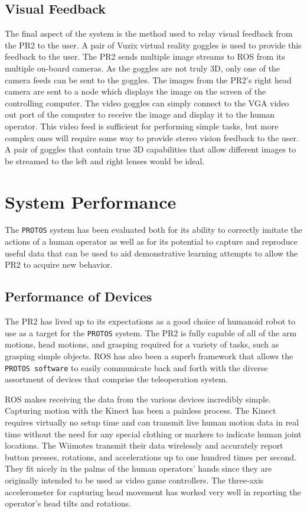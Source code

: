 \documentclass{sig-alternate}
\begin{document}
\subsection{Visual Feedback}
\indent The final aspect of the system is the method used to relay visual feedback from the PR2 to the user.
A pair of  Vuzix virtual reality goggles is used to provide this feedback to the user. The PR2 sends multiple image 
streams to ROS from its multiple on-board cameras. As the goggles are not truly 3D, only one of the camera feeds
can be sent to the goggles. The images from the PR2's right head camera are sent to a node which displays the image
on the screen of the controlling computer. The video goggles can simply connect
to the VGA video out port of the computer to
receive the image and display it to the human operator. This video feed is sufficient
for performing simple tasks, but more complex ones will require some way to provide stereo vision feedback
to the user. A pair of goggles that contain true 3D capabilities that allow different images to be streamed
to the left and right lenses would be ideal.

\section{System Performance}
\label{sec:system_performance}
\indent The {\tt PROTOS} system has been evaluated both for its ability to correctly
imitate the actions of a human operator as well as for its potential 
to capture and reproduce useful data that can be used to aid demonstrative learning
attempts to allow the PR2 to acquire new behavior.

\subsection{Performance of Devices}
\indent The PR2 has lived up to its expectations as a good choice of humanoid robot to 
use as a target for the {\tt PROTOS} system. The 
PR2 is fully capable of all of the arm motions, head motions, and grasping
required for a variety of tasks, such as grasping simple objects. ROS has also been a superb framework that allows the 
{\tt PROTOS software} to easily communicate back and forth with the diverse 
assortment of devices that comprise the teleoperation system.

\indent  ROS makes receiving the data from the various devices incredibly simple. Capturing motion with the Kinect has been a painless process. 
The Kinect requires virtually no setup time and can transmit live human motion data in real time without the 
need for any special clothing or markers to indicate human joint locations.
The Wiimotes transmit their data wirelessly and accurately report button presses, rotations, and accelerations up to one hundred times per second. They fit 
nicely in the palms of the human operators' hands since they are originally intended to be used as video game controllers. The three-axis accelerometer for capturing head 
movement has worked very well in reporting the operator's head tilts and rotations.
\end{document}
